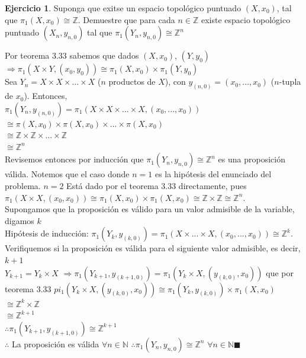 \documentclass[11pt,a4paper,oneside]{report}
\theoremstyle{definition}
\newtheorem{ejercicio}[definicion]{Ejercicio}
\theoremstyle{plain}
\theoremstyle{remark}
\newcommand{\N}{\mathbb{N}}
\newcommand{\Z}{\mathbb{Z}}
\begin{document}
\begin{ejercicio}
  Suponga que exitse un espacio topológico puntuado $(X,x_0)$, tal que $\pi_1 (X,x_0) \cong \Z$. Demuestre que para cada $n \in \Z$
  existe espacio topológico puntuado $(X_n, y_{n,0})$ tal que $\pi_1(Y_n, y_{n,0}) \cong \Z^n$
\end{ejercicio}

Por teorema 3.33 sabemos que dados $(X,x_0)$, $(Y,y_0)$ $\Rightarrow \pi_1(X \times Y,(x_0,y_0)) \cong \pi_1(X,x_0) \times \pi_1(Y,y_0)$\\
Sea $Y_n= X\times X \times ... \times X$ ($n$ productos de $X$), con $y_{(n,0)}=(x_0,...,x_0)$ ($n$-tupla de $x_0$). Entonces, \\
$\pi_1(Y_n,y_{(n,0)})=\pi_1(X\times X \times ... \times X,(x_0,...,x_0))$\\
$\cong \pi(X,x_0) \times\pi(X,x_0) \times... \times \pi(X,x_0)$\\
$\cong \Z \times \Z \times ... \times \Z$\\
$\cong \Z^n$ \\
Revisemos entonces por inducción que $\pi_1(Y_n, y_{n,0}) \cong \Z^n$ es una proposición válida. Notemos que el 
caso donde $n=1$ es la hipótesis del enunciado del problema. $n=2$ Está dado por el teorema 3.33 directamente, pues 
$\pi_1(X \times X, (x_0, x_0))\cong \pi_1 (X,x_0)\times  \pi_1 (X,x_0)\cong \Z \times \Z \cong \Z ^n$.\\
Supongamos que la proposición es válido para un valor admisible de la variable, digamos $k$\\
Hipótesis de inducción: $\pi_1(Y_k,y_{(k,0)})=\pi_1(X\times ... \times X,(x_0,...,x_0)) \cong \Z^k$.\\
Verifiquemos si la proposición es válida para el siguiente valor admisible, es decir, $k+1$\\
$Y_{k+1}=Y_k \times X$ $\Rightarrow \pi_1(Y_{k+1},y_{(k+1,0)})=\pi_1(Y_k\times X, (y_{(k,0)},x_0))$ que por teorema 3.33
$pi_1(Y_k\times X, (y_{(k,0)},x_0))\cong \pi_1(Y_k,y_{(k,0)}) \times \pi_1(X,x_0)$\\
$\cong \Z^k \times \Z$\\
$\cong \Z^{k+1}$\\
$\therefore \pi_1(Y_{k+1},y_{(k+1,0)})\cong \Z^{k+1}$\\
$\therefore$ La proposición es válida $\forall n \in \N$
$\therefore \pi_1(Y_n, y_{n,0}) \cong \Z^n$ $\forall n \in \N \blacksquare$
\end{document}
